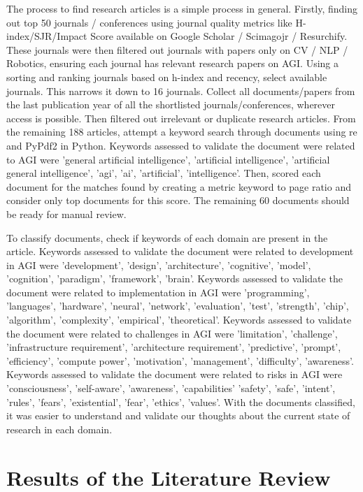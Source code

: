 \documentclass{article}
\begin{document}
The process to find research articles is a simple process in general. Firstly, finding out top 50 journals / conferences using journal quality metrics like H-index/SJR/Impact Score available on Google Scholar / Scimagojr / Resurchify.
These journals were then filtered out journals with papers only on CV / NLP / Robotics, ensuring each journal has relevant research papers on AGI.
Using a sorting and ranking journals based on h-index and recency, select available journals. This narrows it down to 16 journals.
Collect all documents/papers from the last publication year of all the shortlisted journals/conferences, wherever access is possible. Then filtered out irrelevant or duplicate research articles.
From the remaining 188 articles, attempt a keyword search through documents using re and PyPdf2 in Python. Keywords assessed to validate the document were related to AGI were 'general artificial intelligence', 'artificial intelligence', 'artificial general intelligence', 'agi', 'ai', 'artificial', 'intelligence'.
Then, scored each document for the matches found by creating a metric keyword to page ratio and consider only top documents for this score. The remaining 60 documents should be ready for manual review.

To classify documents, check if keywords of each domain are present in the article. Keywords assessed to validate the document were related to development in AGI were 'development', 'design', 'architecture', 'cognitive', 'model', 'cognition', 'paradigm', 'framework', 'brain'. Keywords assessed to validate the document were related to implementation in AGI were 'programming', 'languages', 'hardware', 'neural', 'network', 'evaluation', 'test', 'strength', 'chip', 'algorithm', 'complexity', 'empirical', 'theoretical'. Keywords assessed to validate the document were related to challenges in AGI were 'limitation', 'challenge', 'infrastructure requirement', 'architecture requirement', 'predictive', 'prompt', 'efficiency', 'compute power', 'motivation', 'management', 'difficulty', 'awareness'. Keywords assessed to validate the document were related to risks in AGI were 'consciousness', 'self-aware', 'awareness', 'capabilities' 'safety', 'safe', 'intent', 'rules', 'fears', 'existential', 'fear', 'ethics', 'values'. 
With the documents classified, it was easier to understand and validate our thoughts about the current state of research in each domain.

\section{Results of the Literature Review}
\end{document}

